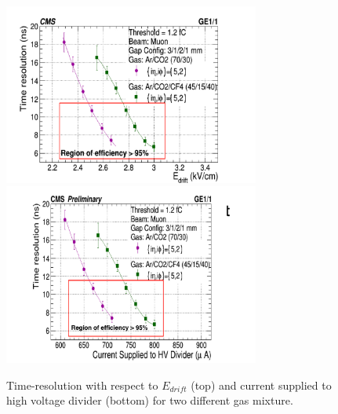 \begin{figure}[!htbp]
\centering
\includegraphics[width=0.75\textwidth]{figures/GEM/TimeResolution_Edrift.pdf}\\
\includegraphics[width=0.75\textwidth]{figures/GEM/TimeResolution_Current.pdf}\\
\caption{Time-resolution with respect to $E_{drift}$ (top) and current supplied to high voltage divider (bottom) for two different gas mixture.}
\label{TimeResolution}
\end{figure}
